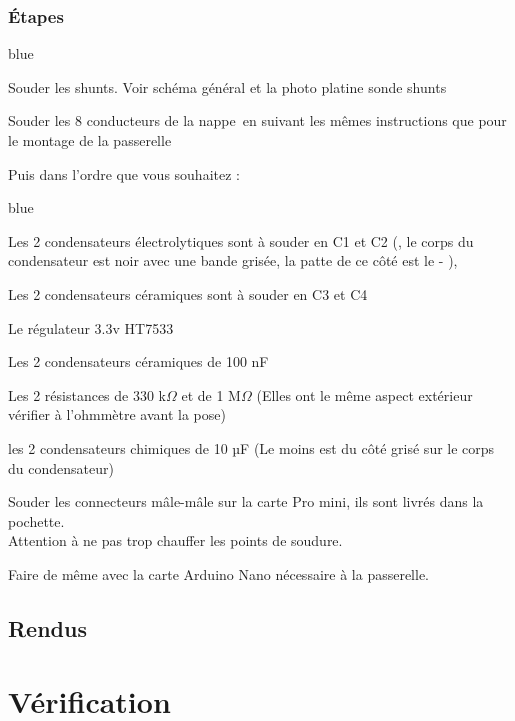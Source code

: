 \subsection{Étapes}
\begin{items}{blue}{\Triangle}
\item Souder les shunts. Voir schéma général et la photo platine sonde shunts
\item Souder les 8 conducteurs de la nappe en suivant les mêmes instructions que pour le montage de la passerelle
\end{items}
Puis dans l'ordre que vous souhaitez : 
\begin{items}{blue}{\Triangle}
    \item Les 2 condensateurs électrolytiques sont à souder en C1 et C2 (, le corps du condensateur est noir avec une bande grisée, la patte de ce côté est le - ),
    \item Les 2 condensateurs céramiques sont à souder en C3 et C4
    \item Le régulateur 3.3v HT7533\\

    \item Les 2 condensateurs céramiques de 100 nF
    \item Les 2 résistances de 330 k$\Omega$ et de 1 M$\Omega$    (Elles ont le même aspect extérieur vérifier à l’ohmmètre avant la pose)
    \item les 2 condensateurs chimiques de 10 µF	(Le moins est du côté grisé sur le corps du condensateur)
    \item Souder les connecteurs mâle-mâle sur la carte Pro mini, ils sont livrés dans la pochette.\\ Attention à ne pas trop chauffer les points de soudure.
    \item Faire de même avec la carte Arduino Nano nécessaire à la passerelle.
\end{items}

\section{Rendus}

\chapter{Vérification}

